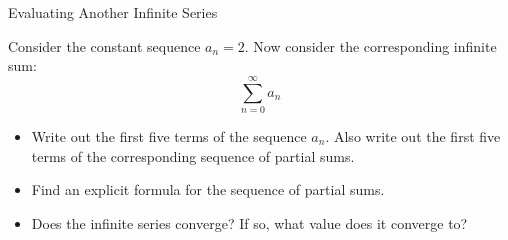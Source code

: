 \begin{exercise}{Evaluating Another Infinite Series \Coffeecup \Coffeecup}

Consider the constant sequence $ a_n=2$.  Now consider the corresponding infinite sum: $$ \sum_{n=0}^{\infty} a_n$$
\begin{itemize}

\item Write out the first five terms of the sequence $a_n$.  Also write out the first five terms of the corresponding sequence of partial sums.


\item  Find an explicit formula for the sequence of partial sums.


\item Does the infinite series converge?  If so, what value does it converge to?

\end{itemize}
\end{exercise}

